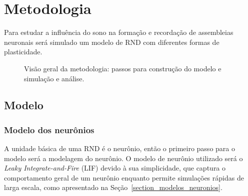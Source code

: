 \chapter{Metodologia}

Para estudar a influência do sono na formação e recordação de assembleias neu\-ro\-nais será simulado um modelo de RND com diferentes
formas de plasticidade.


\begin{figure}[!ht]
\caption{Visão geral da metodologia: passos para construção do modelo e simulação e análise.}
\end{figure}

\section{Modelo}

\subsection{Modelo dos neurônios}

A unidade básica de uma RND é o neurônio, então o primeiro passo para o modelo será a modelagem do neurônio. O modelo de neurônio
utilizado será o \textit{Leaky Integrate-and-Fire} (LIF) devido à sua simplicidade, que captura o comportamento geral de um
neurônio enquanto permite simulações rápidas de larga escala, como apresentado na Seção~\ref{section_modelos_neuronios}.

